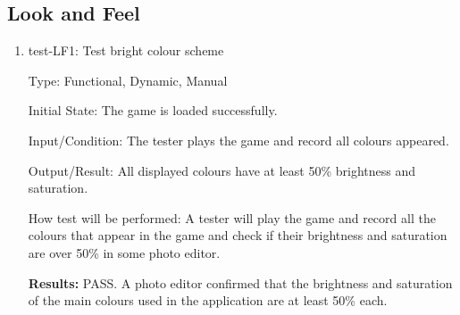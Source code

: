 \documentclass[12pt, titlepage]{article}
\begin{document}
\subsection{Look and Feel}
\begin{enumerate}

\item{test-LF1: Test bright colour scheme\\}

Type: Functional, Dynamic, Manual
					
Initial State: The game is loaded successfully.
					
Input/Condition: The tester plays the game and record all colours appeared.
					
Output/Result: All displayed colours have at least 50\% brightness and saturation.  
					
How test will be performed: A tester will play the game and record all the colours that appear in the game and check if their brightness and saturation are over 50\% in some photo editor.

\textbf{Results:} PASS. A photo editor confirmed that the brightness and saturation of the main colours used in the application are at least 50\% each.

\end{enumerate}
\end{document}
